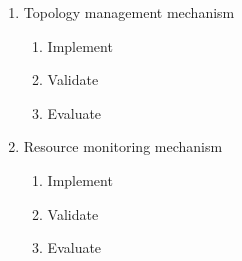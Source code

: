 \begin{enumerate}
    \item Topology management mechanism
    \begin{enumerate}
        \item Implement
        \item Validate
        \item Evaluate
    \end{enumerate}

    \item Resource monitoring mechanism
    \begin{enumerate}
        \item Implement
        \item Validate
        \item Evaluate
    \end{enumerate}
    
\end{enumerate}








